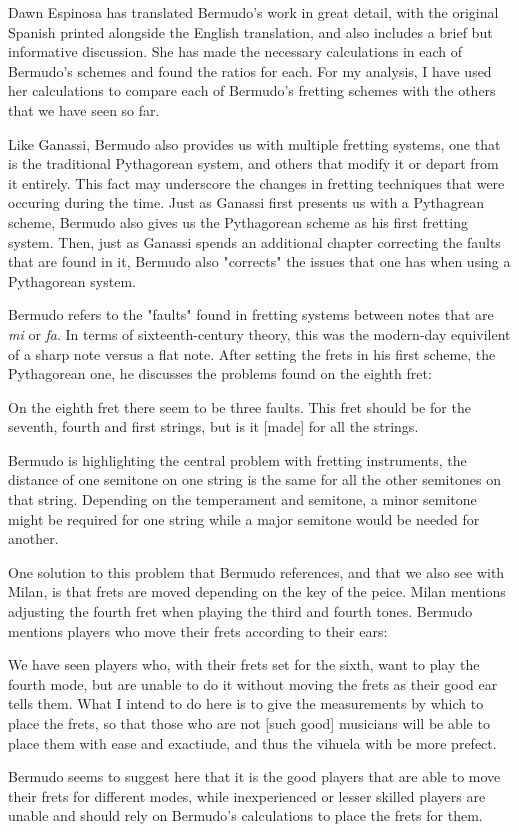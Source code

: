 Dawn Espinosa has translated Bermudo's work in great detail, with the original Spanish printed alongside
the English translation, and also includes a brief but informative discussion.  She has made
the necessary calculations in each of Bermudo's schemes and found the ratios for each.
For my analysis, I have used her calculations to compare each of Bermudo's fretting schemes
with the others that we have seen so far.

Like Ganassi, Bermudo also provides us with multiple fretting systems, one that is the traditional
Pythagorean system, and others that modify it or depart from it entirely.  This fact
may underscore the changes in fretting techniques that were occuring during the time.  Just as
Ganassi first presents us with a Pythagrean scheme, Bermudo also gives us the Pythagorean scheme
as his first fretting system.  Then, just as Ganassi spends an additional chapter correcting
the faults that are found in it, Bermudo also "corrects" the issues that one has when using
a Pythagorean system.

Bermudo refers to the "faults" found in fretting systems between notes that are \textit{mi} or
\textit{fa}.  In terms of sixteenth-century theory, this was the modern-day
equivilent of a sharp note versus a flat note.  After setting the frets in his first scheme,
the Pythagorean one, he discusses the problems found on the eighth fret:
\begin{blocks}
On the eighth fret there seem to be three faults.  This fret should be  for the
seventh, fourth and first strings, but is it [made]  for all the strings.
\autocite[95]{DE:1}
\end{blocks}
Bermudo is highlighting the central problem with fretting instruments, the distance of one
semitone on one string is the same for all the other semitones on that string.  Depending
on the temperament and semitone, a minor semitone might be required for one string while
a major semitone would be needed for another.

One solution to this problem that Bermudo references, and that we also see with Milan, is
that frets are moved depending on the key of the peice.  Milan mentions adjusting the
fourth fret when playing the third and fourth tones.  Bermudo mentions players who move their
frets according to their ears:
\begin{blocks}
We have seen players who, with their frets set for the sixth, want to play the fourth mode,
but are unable to do it without moving the frets as their good ear tells them.  What I intend
to do here is to give the measurements by which to place the frets, so that those who are not
[such good] musicians will be able to place them with ease and exactiude, and thus the vihuela
with be more prefect.
\autocite[78]{DE:1}
\end{blocks}
Bermudo seems to suggest here that it is the good players that are able to move their frets
for different modes, while inexperienced or lesser skilled players are unable and should
rely on Bermudo's calculations to place the frets for them.

